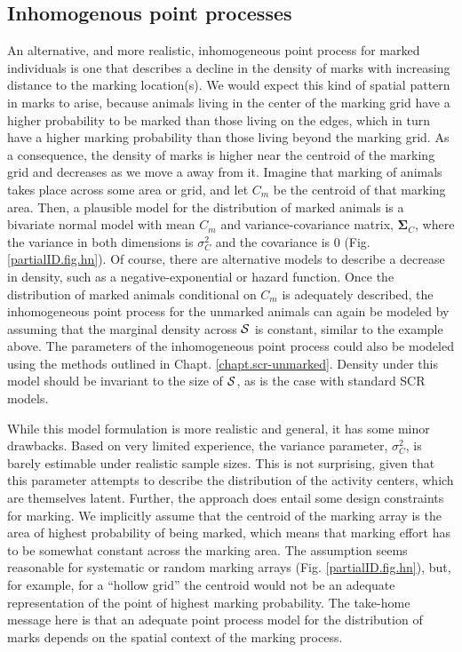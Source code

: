 \subsection{Inhomogenous point processes}
An alternative, and more realistic, inhomogeneous point process for marked individuals is one that describes a decline in the density of marks with increasing distance to the marking location(s). We would expect this kind of spatial pattern in marks to arise, because animals living in the center of the marking grid have a higher probability to be marked than those living on the edges, which in turn have a higher marking probability than those living beyond the marking grid. As a consequence, the density of marks is higher near the centroid of the marking grid and decreases as we move a away from it. Imagine that marking of animals takes place across some area or grid, and let $C_m$ be the centroid of that marking area. Then, a plausible model for the distribution of marked animals is a bivariate normal model with mean $C_m$ and variance-covariance matrix, ${\bm \Sigma_C}$, where the variance in both
dimensions is $\sigma_C^2$ and the covariance is 0 (Fig. \ref{partialID.fig.hn}).
Of course, there are alternative models to describe a decrease in density, such as a negative-exponential or hazard function. Once the distribution of marked animals conditional on $C_m$ is adequately described, the
inhomogeneous point process for the unmarked animals can again be modeled by assuming that the marginal density across ${\cal S}$ is constant, similar to the example above.  The parameters of the inhomogeneous point process could also be modeled using the methods outlined in Chapt. \ref{chapt.scr-unmarked}.   Density under this model should be invariant to the size of ${\cal S}$, as is the case with standard SCR models.   

While this model formulation is more realistic and general, it has some minor drawbacks. Based on very limited experience, the variance parameter, $\sigma_C^2$, is barely estimable under realistic sample sizes. This is not surprising, given that this parameter attempts to describe the distribution of the activity centers, which are themselves latent. Further, the approach does entail some design constraints for marking. We implicitly assume that the centroid of the marking array is the area of highest probability of being marked, which means that marking effort has to be somewhat constant across the marking area. The assumption seems reasonable for systematic or random marking arrays (Fig. \ref{partialID.fig.hn}), but, for example, for a ``hollow grid'' the centroid would not be an adequate representation of the point of highest marking probability.
The take-home message here is that an adequate point process model for the distribution of marks depends on the spatial context of the marking process.

